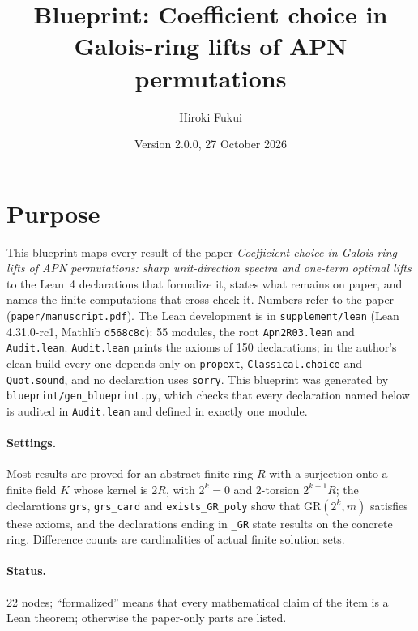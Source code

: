 \documentclass[11pt]{article}
\title{Blueprint: Coefficient choice in Galois-ring lifts of APN permutations}
\author{Hiroki Fukui}
\date{Version 2.0.0, 27 October 2026}
\begin{document}
\maketitle
\section*{Purpose}
This blueprint maps every result of the paper \emph{Coefficient choice in Galois-ring lifts of APN permutations: sharp
unit-direction spectra and one-term optimal lifts} to the Lean~4 declarations that formalize it, states what remains
on paper, and names the finite computations that cross-check it. Numbers refer to the paper (\texttt{paper/manuscript.pdf}).
The Lean development is in \texttt{supplement/lean} (Lean 4.31.0-rc1, Mathlib \texttt{d568c8c}): 55 modules, the root
\texttt{Apn2R03.lean} and \texttt{Audit.lean}. \texttt{Audit.lean} prints the axioms of 150 declarations; in the author's
clean build every one depends only on \texttt{propext}, \texttt{Classical.choice} and \texttt{Quot.sound}, and no
declaration uses \texttt{sorry}. This blueprint was generated by \texttt{blueprint/gen\_blueprint.py}, which checks that
every declaration named below is audited in \texttt{Audit.lean} and defined in exactly one module.

\paragraph{Settings.} Most results are proved for an abstract finite ring $R$ with a surjection onto a finite field $K$
whose kernel is $2R$, with $2^k=0$ and $2$-torsion $2^{k-1}R$; the declarations \texttt{grs}, \texttt{grs\_card} and
\texttt{exists\_GR\_poly} show that $\mathrm{GR}(2^k,m)$ satisfies these axioms, and the declarations ending in
\texttt{\_GR} state results on the concrete ring. Difference counts are cardinalities of actual finite solution sets.

\paragraph{Status.} 22 nodes; ``formalized'' means that every mathematical claim of the item is a Lean theorem;
otherwise the paper-only parts are listed.
\end{document}
